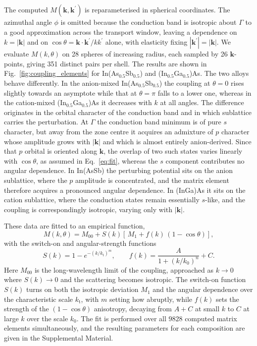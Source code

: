 \documentclass[aps,prmaterials,reprint,amsmath,amssymb,superscriptaddress]{revtex4-2}
\begin{document}
The computed $M(\bm{k},\bm{k}^\prime)$ is reparameterised in spherical coordinates. The azimuthal angle $\phi$ is omitted because the conduction band is isotropic about $\Gamma$ to a good approximation across the transport window, leaving a dependence on $k=|\bm{k}|$ and on $\cos\theta = \bm{k}\cdot\bm{k}^\prime/kk^\prime$ alone, with elasticity fixing $|\bm{k}^\prime|=|\bm{k}|$. We evaluate $M(k,\theta)$ on 28 spheres of increasing radius, each sampled by 26 $\bm{k}$-points, giving 351 distinct pairs per shell. The results are shown in Fig.~\ref{fig:coupling_elements} for In(As$_{0.5}$Sb$_{0.5}$) and (In$_{0.5}$Ga$_{0.5}$)As. 
The two alloys behave differently. In the anion-mixed In(As$_{0.5}$Sb$_{0.5}$) the coupling at $\theta=0$ rises slightly towards an asymptote while that at $\theta=\pi$ falls to a lower one, whereas in the cation-mixed (In$_{0.5}$Ga$_{0.5}$)As it decreases with $k$ at all angles. The difference originates in the orbital character of the conduction band and in which sublattice carries the perturbation. At $\Gamma$ the conduction band minimum is of pure $s$ character, but away from the zone centre it acquires an admixture of $p$ character whose amplitude grows with $|\bm{k}|$ and which is almost entirely anion-derived\cite{Gentles2026a}. Since that $p$ orbital is oriented along $\bm{k}$, the overlap of two such states varies linearly with $\cos\theta$, as assumed in Eq.~\eqref{eq:fit}, whereas the $s$ component contributes no angular dependence. In In(AsSb) the perturbing potential sits on the anion sublattice, where the $p$ amplitude is concentrated, and the matrix element therefore acquires a pronounced angular dependence. In (InGa)As it sits on the cation sublattice, where the conduction states remain essentially $s$-like, and the coupling is correspondingly isotropic, varying only with $|\bm{k}|$.

These data are fitted to an empirical function,
\begin{equation}
    M(k,\theta) = M_{00} + S(k)\left[\,M_{1} + f(k)\,(1-\cos\theta)\right],
    \label{eq:fit}
\end{equation}
with the switch-on and angular-strength functions
\begin{equation}
    S(k) = 1 - e^{-(k/k_\text{t})^{m}},
    \qquad
    f(k) = \frac{A}{1+(k/k_0)^{n}} + C.
    \label{eq:fit_components}
\end{equation}
Here $M_{00}$ is the long-wavelength limit of the coupling, approached as $k\to0$ where $S(k)\to0$ and the scattering becomes isotropic. The switch-on function $S(k)$ turns on both the isotropic deviation $M_1$ and the angular dependence over the characteristic scale $k_\text{t}$, with $m$ setting how abruptly, while $f(k)$ sets the strength of the $(1-\cos\theta)$ anisotropy, decaying from $A+C$ at small $k$ to $C$ at large $k$ over the scale $k_0$. The fit is performed over all $9828$ computed matrix elements simultaneously, and the resulting parameters for each composition are given in the Supplemental Material.
\end{document}
